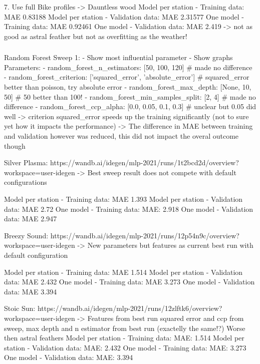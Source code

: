 \documentclass[a4paper]{article}
\begin{document}
    7. Use full Bike profiles -> Dauntless wood
    Model per station - Training data: MAE 0.83188
    Model per station - Validation data: MAE 2.31577
    One model - Training data: MAE 0.92461
    One model - Validation data: MAE 2.419
    -> not as good as astral feather but not as overfitting as the weather!


    \subsubsection*{}

    Random Forest Sweep 1:
    - Show most influential parameter
    - Show graphs
    Parameters:
    - random\_forest\_n\_estimators:  [50, 100, 120] \# made no difference
    - random\_forest\_criterion: ['squared\_error', 'absolute\_error']  \# squared\_error better than poisson, try absolute error
    - random\_forest\_max\_depth: [None, 10, 50]  \# 50 better than 100!
    - random\_forest\_min\_samples\_split: [2, 4] \# made no difference
    - random\_forest\_ccp\_alpha: [0.0, 0.05, 0.1, 0.3]  \# unclear but 0.05 did well
    -> criterion squared\_error speeds up the training significantly (not to sure yet how it impacts the performance)
    -> The difference in MAE between training and validation however was reduced, this did not impact the overal outcome though

    Silver Plasma: https://wandb.ai/idegen/mlp-2021/runs/1t2bcd2d/overview?workspace=user-idegen
    -> Best sweep result does not compete with default configurations

    Model per station - Training data: MAE 1.393
    Model per station - Validation data: MAE 2.72
    One model - Training data: MAE: 2.918
    One model - Validation data: MAE 2.947

    Breezy Sound: https://wandb.ai/idegen/mlp-2021/runs/12p54n9c/overview?workspace=user-idegen
    -> New parameters but features as current best run with default configuration

    Model per station - Training data: MAE 1.514
    Model per station - Validation data: MAE 2.432
    One model - Training data: MAE 3.273
    One model - Validation data: MAE 3.394

    Stoic Sun: https://wandb.ai/idegen/mlp-2021/runs/12zlftk6/overview?workspace=user-idegen
    -> Features from best run squared error and ccp from sweep, max depth and n estimator from best run (exactelly the same!?)
    Worse then astral feathers
    Model per station - Training data: MAE: 1.514
    Model per station - Validation data: MAE: 2.432
    One model - Training data: MAE: 3.273
    One model - Validation data: MAE: 3.394
\end{document}
